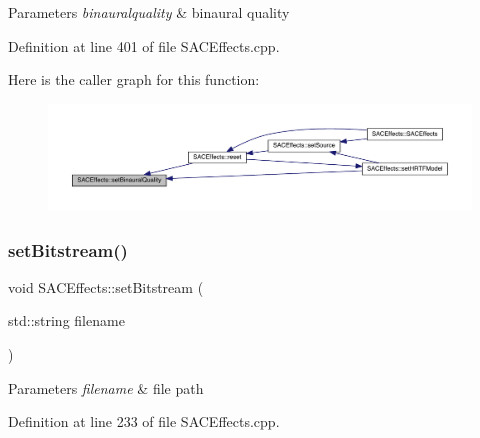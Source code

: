 \begin{DoxyParams}{Parameters}
{\em binauralquality} & binaural quality \\
\hline
\end{DoxyParams}


Definition at line 401 of file S\+A\+C\+Effects.\+cpp.

Here is the caller graph for this function\+:
\nopagebreak
\begin{figure}[H]
\begin{center}
\leavevmode
\includegraphics[width=350pt]{class_s_a_c_effects_aa0b1fa3cd01ea58fd6ae155dd3b12566_icgraph}
\end{center}
\end{figure}
\mbox{\label{class_s_a_c_effects_a4ff113bcbd922362d8fcb9ef61d3641b}} 
\subsubsection{\texorpdfstring{set\+Bitstream()}{setBitstream()}}
{\footnotesize\ttfamily void S\+A\+C\+Effects\+::set\+Bitstream (\begin{DoxyParamCaption}\item[{std\+::string}]{filename }\end{DoxyParamCaption})}


\begin{DoxyParams}{Parameters}
{\em filename} & file path \\
\hline
\end{DoxyParams}


Definition at line 233 of file S\+A\+C\+Effects.\+cpp.

